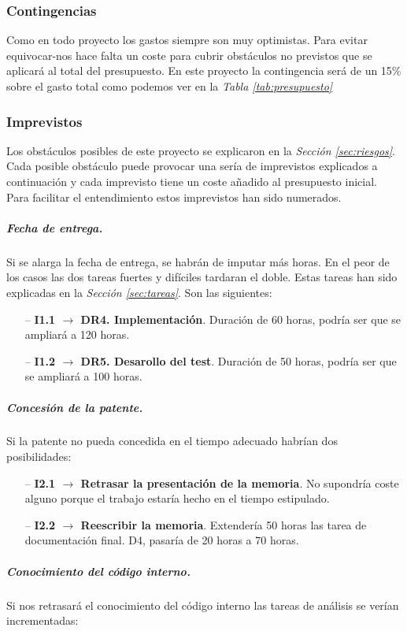 \documentclass[12pt]{article}
\begin{document}
    \subsubsection{Contingencias}
    Como en todo proyecto los gastos siempre son muy optimistas. Para evitar equivocar-nos hace falta un coste para cubrir obstáculos no previstos que se aplicará al total del presupuesto. En este proyecto la contingencia será de un 15\% sobre el gasto total como podemos ver en la \textit{Tabla \ref{tab:presupuesto}}  
    \subsubsection{Imprevistos}
    Los obstáculos posibles de este proyecto se explicaron en la  \textit{Sección \ref{sec:riesgos}}. Cada posible obstáculo puede provocar una sería de imprevistos explicados a continuación y cada imprevisto tiene un coste añadido al presupuesto inicial. Para facilitar el entendimiento estos imprevistos han sido numerados.
	\subparagraph{Fecha de entrega.} Si se alarga la fecha de entrega, se habrán de imputar más horas. En el peor de los casos las dos tareas fuertes y difíciles tardaran el doble. Estas tareas han sido explicadas en la \textit{Sección \ref{sec:tareas}}. Son las siguientes:
        \begin{itemize}
        \setlength{\itemindent}{2em}
            \item[--] \textbf{I1.1 $\rightarrow$ DR4. Implementación}. Duración de 60 horas, podría ser que se ampliará a 120 horas.
            \item[--] \textbf{I1.2 $\rightarrow$ DR5. Desarollo del test}. Duración de 50 horas, podría ser que se ampliará a 100 horas.
        \end{itemize}
    \subparagraph{Concesión de la patente.} Si la patente no pueda concedida en el tiempo adecuado habrían dos posibilidades:
        \begin{itemize}
        \setlength{\itemindent}{2em}
            \item[--] \textbf{I2.1 $\rightarrow$ Retrasar la presentación de la memoria}. No supondría coste alguno porque el trabajo estaría hecho en el tiempo estipulado.
            \item[--] \textbf{I2.2 $\rightarrow$ Reescribir la memoria}. Extendería 50 horas las tarea de documentación final. D4, pasaría de 20 horas a 70 horas. 
        \end{itemize}
    \subparagraph{Conocimiento del código interno.} Si nos retrasará el conocimiento del código interno las tareas de análisis se verían incrementadas:
\end{document}

